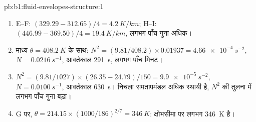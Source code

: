\begin{solution}{pb:b1:fluid-envelopes-structure:1}
\begin{enumerate}
  \item E--F: $(329.29 - 312.65)/4 = \qty{4.2}{K/km}$; H--I: $(446.99 -
        369.50)/4 = \qty{19.4}{K/km}$, लगभग पाँच गुना अधिक।
  \item माध्य $\theta = \qty{408.2}{K}$ के साथ: $N^2 = (9.81/408.2) \times
        0.01937 = \qty{4.66e-4}{s^{-2}}$, $N = \qty{0.0216}{s^{-1}}$, आवर्तकाल \qty{291}{s}, लगभग पाँच मिनट।
  \item $N^2 = (9.81/1027) \times (26.35 - 24.79)/150 = \qty{9.9e-5}{s^{-2}}$,
        $N = \qty{0.0100}{s^{-1}}$, आवर्तकाल \qty{630}{s}। निचला समतापमंडल अधिक स्थायी है, $N^2$  की तुलना में लगभग पाँच गुना बड़ा।
  \item G पर, $\theta = 214.15 \times (1000/186)^{2/7} = \qty{346}{K}$: क्षोभसीमा पर  लगभग \qty{346}{K} है।
\end{enumerate}
\end{solution}

